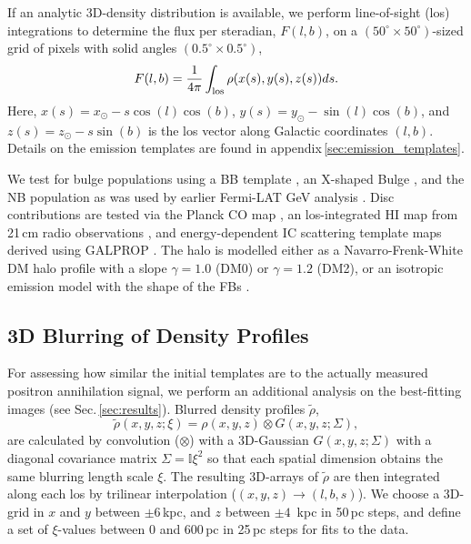 \documentclass[doublespace,draft,nopageskip]{VTthesis} %
\begin{document}
	
	If an analytic 3D-density distribution is available, we perform line-of-sight (los) integrations to determine the flux per steradian, $F(l,b)$, on a $(50^{\circ} \times 50^{\circ})$-sized grid of pixels with solid angles $(0.5^{\circ} \times 0.5^{\circ})$,
	\begin{equation}
		F(l,b) = \frac{1}{4\pi} \int_{\rm los} \rho(x(s),y(s),z(s)) ds\mathrm{.}
		\label{eq:los_integral}
	\end{equation}
	\noindent Here, $x(s) = x_{\odot} - s \cos(l) \cos(b)$, $y(s) = y_{\odot} - \sin(l) \cos(b)$, and $z(s) = z_{\odot} - s \sin(b)$ is the los vector along Galactic coordinates $(l,b)$.
	Details on the emission templates are found in appendix\,\ref{sec:emission_templates}.
	
	
	We test for bulge populations using a BB template \citep{Freudenreich1998_BoxyBulge_COBE}, an X-shaped Bulge \citep[XB;][]{Ness2016_Xbulge_WISE}, and the NB \citep{Launhardt2002_NB} population as was used by earlier Fermi-LAT GeV analysis \cite[e.g.,][]{Macias2018_LATGeV,Bartels2018_GeVexcess_stars}.
	Disc contributions are tested via the Planck CO map \citep{Planck2016_foregrounds}, an los-integrated HI map from 21\,cm radio observations \citep{Dickey1990_HI}, and  energy-dependent IC scattering template maps derived using GALPROP  \citep{Strong2007_GALPROP}.
	The halo is modelled either as a Navarro-Frenk-White \citep{Navarro1997_NFW} DM halo profile with a slope $\gamma = 1.0$ (DM0) or $\gamma=1.2$ (DM2), or an isotropic emission model with the shape of the FBs \citep{Su2010_fermibubbles}.
	
	
	\subsection{3D Blurring of Density Profiles}\label{sec:blurring_maps}
	For assessing how similar the initial templates are to the actually measured positron annihilation signal, we perform an additional analysis on the best-fitting images (see Sec.\,\ref{sec:results}).
	Blurred density profiles $\tilde{\rho}$,
	\begin{equation}
		\tilde{\rho}(x,y,z;\xi) = \rho(x,y,z) \otimes G(x,y,z;\Sigma)\mathrm{,} 
		\label{eq:3Dblurring}
	\end{equation}
	\noindent are calculated by convolution ($\otimes$) with a 3D-Gaussian  $G(x,y,z;\Sigma)$ with a diagonal covariance matrix $\Sigma = \mathbb{I}\xi^2$ so that each spatial dimension obtains the same blurring length scale $\xi$.
	The resulting 3D-arrays of $\tilde{\rho}$ are then integrated along each los by trilinear interpolation ($(x,y,z) \rightarrow (l,b,s)$).
	We choose a 3D-grid in $x$ and $y$ between $\pm 6$\,kpc, and $z$ between $\pm 4$\, kpc in 50\,pc steps, and define a set of $\xi$-values between 0 and 600\,pc in 25\,pc steps for fits to the data.
	
\end{document}
